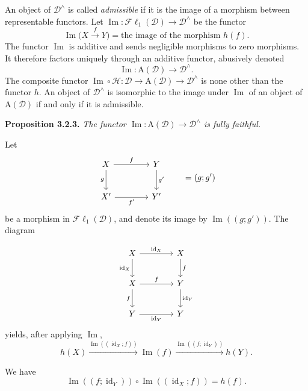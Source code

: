 \clearpage
{}%
\begingroup\small
\setlength{\parskip}{0pt}\setlength{\emergencystretch}{1.5em}

An object of $\mathcal D^\wedge$ is called \emph{admissible} if it is the
image of a morphism between representable functors. Let
$\operatorname{Im}\colon\mathcal{F}\ell_1(\mathcal D)\to\mathcal D^\wedge$
be the functor
\[
\operatorname{Im}\bigl(X\xrightarrow fY\bigr)
=\text{the image of the morphism }h(f).
\tag{3.2.2.1}
\]
The functor $\operatorname{Im}$ is additive and sends negligible morphisms to
zero morphisms. It therefore factors uniquely through an additive functor,
abusively denoted
\[
\operatorname{Im}\colon\mathrm A(\mathcal D)\longrightarrow\mathcal D^\wedge.
\tag{3.2.2.2}
\]
The composite functor
$\operatorname{Im}\circ\mathcal H\colon
\mathcal D\longrightarrow\mathrm A(\mathcal D)
\longrightarrow\mathcal D^\wedge$
is none other than the functor $h$. An object of
$\mathcal D^\wedge$ is isomorphic to the image under $\operatorname{Im}$ of an object of
$\mathrm A(\mathcal D)$ if and only if it is admissible.

\medskip\noindent\textbf{Proposition 3.2.3.}\quad
\textit{The functor
$\operatorname{Im}\colon\mathrm A(\mathcal D)\to\mathcal D^\wedge$ is fully
faithful.}

Let
\[
\begin{tikzcd}[column sep=4em,row sep=2.4em]
X\arrow[r,"f"]\arrow[d,"g"']&Y\arrow[d,"g'"]\\
X'\arrow[r,"f'"']&Y'
\end{tikzcd}
\qquad=(g;g')
\]
be a morphism in $\mathcal{F}\ell_1(\mathcal D)$, and denote its image by
$\operatorname{Im}((g;g'))$. The diagram

\[
\begin{tikzcd}[column sep=4em,row sep=2.2em]
X\arrow[r,"\operatorname{id}_X"]\arrow[d,"\operatorname{id}_X"']&X\arrow[d,"f"]\\
X\arrow[r,"f"]\arrow[d,"f"']&Y\arrow[d,"\operatorname{id}_Y"]\\
Y\arrow[r,"\operatorname{id}_Y"']&Y
\end{tikzcd}
\]
yields, after applying $\operatorname{Im}$,
\[
h(X)\xrightarrow{\operatorname{Im}((\operatorname{id}_X;f))}
\operatorname{Im}(f)\xrightarrow{\operatorname{Im}((f;\operatorname{id}_Y))}h(Y).
\]

We have
\[
\operatorname{Im}((f;\operatorname{id}_Y))\circ
\operatorname{Im}((\operatorname{id}_X;f))=h(f).
\tag{3.2.3.1}
\]
\endgroup
